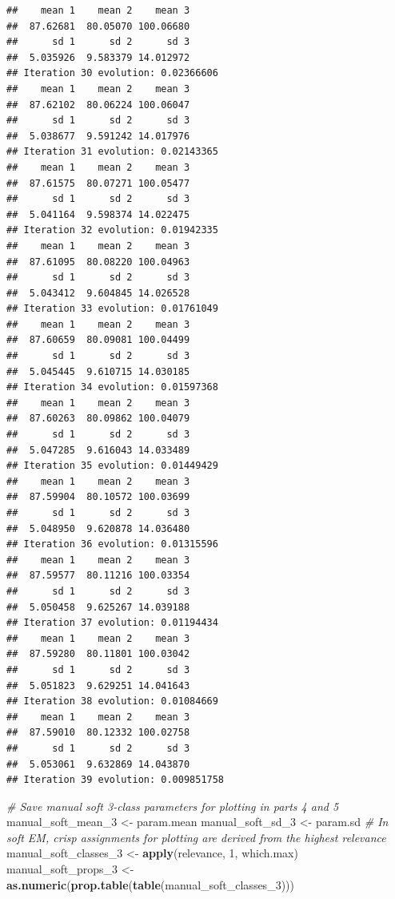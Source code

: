 \documentclass[
]{article}
\newenvironment{Shaded}{\begin{snugshade}}{\end{snugshade}}
\newcommand{\CommentTok}[1]{\textcolor[rgb]{0.56,0.35,0.01}{\textit{#1}}}
\newcommand{\DecValTok}[1]{\textcolor[rgb]{0.00,0.00,0.81}{#1}}
\newcommand{\FunctionTok}[1]{\textcolor[rgb]{0.13,0.29,0.53}{\textbf{#1}}}
\newcommand{\NormalTok}[1]{#1}
\newcommand{\OtherTok}[1]{\textcolor[rgb]{0.56,0.35,0.01}{#1}}
\begin{document}
\begin{verbatim}
##    mean 1    mean 2    mean 3 
##  87.62681  80.05070 100.06680 
##      sd 1      sd 2      sd 3 
##  5.035926  9.583379 14.012972 
## Iteration 30 evolution: 0.02366606 
##    mean 1    mean 2    mean 3 
##  87.62102  80.06224 100.06047 
##      sd 1      sd 2      sd 3 
##  5.038677  9.591242 14.017976 
## Iteration 31 evolution: 0.02143365 
##    mean 1    mean 2    mean 3 
##  87.61575  80.07271 100.05477 
##      sd 1      sd 2      sd 3 
##  5.041164  9.598374 14.022475 
## Iteration 32 evolution: 0.01942335 
##    mean 1    mean 2    mean 3 
##  87.61095  80.08220 100.04963 
##      sd 1      sd 2      sd 3 
##  5.043412  9.604845 14.026528 
## Iteration 33 evolution: 0.01761049 
##    mean 1    mean 2    mean 3 
##  87.60659  80.09081 100.04499 
##      sd 1      sd 2      sd 3 
##  5.045445  9.610715 14.030185 
## Iteration 34 evolution: 0.01597368 
##    mean 1    mean 2    mean 3 
##  87.60263  80.09862 100.04079 
##      sd 1      sd 2      sd 3 
##  5.047285  9.616043 14.033489 
## Iteration 35 evolution: 0.01449429 
##    mean 1    mean 2    mean 3 
##  87.59904  80.10572 100.03699 
##      sd 1      sd 2      sd 3 
##  5.048950  9.620878 14.036480 
## Iteration 36 evolution: 0.01315596 
##    mean 1    mean 2    mean 3 
##  87.59577  80.11216 100.03354 
##      sd 1      sd 2      sd 3 
##  5.050458  9.625267 14.039188 
## Iteration 37 evolution: 0.01194434 
##    mean 1    mean 2    mean 3 
##  87.59280  80.11801 100.03042 
##      sd 1      sd 2      sd 3 
##  5.051823  9.629251 14.041643 
## Iteration 38 evolution: 0.01084669 
##    mean 1    mean 2    mean 3 
##  87.59010  80.12332 100.02758 
##      sd 1      sd 2      sd 3 
##  5.053061  9.632869 14.043870 
## Iteration 39 evolution: 0.009851758
\end{verbatim}

\begin{Shaded}
\begin{Highlighting}[]
\CommentTok{\# Save manual soft 3{-}class parameters for plotting in parts 4 and 5}
\NormalTok{manual\_soft\_mean\_3 }\OtherTok{\textless{}{-}}\NormalTok{ param.mean}
\NormalTok{manual\_soft\_sd\_3 }\OtherTok{\textless{}{-}}\NormalTok{ param.sd}
\CommentTok{\# In soft EM, crisp assignments for plotting are derived from the highest relevance}
\NormalTok{manual\_soft\_classes\_3 }\OtherTok{\textless{}{-}} \FunctionTok{apply}\NormalTok{(relevance, }\DecValTok{1}\NormalTok{, which.max)}
\NormalTok{manual\_soft\_props\_3 }\OtherTok{\textless{}{-}} \FunctionTok{as.numeric}\NormalTok{(}\FunctionTok{prop.table}\NormalTok{(}\FunctionTok{table}\NormalTok{(manual\_soft\_classes\_3)))}
\end{Highlighting}
\end{Shaded}
\end{document}
